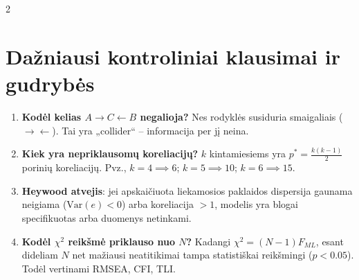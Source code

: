 \documentclass[9pt,a4paper]{article}
\begin{document}
\begin{multicols*}{2}
\section{Dažniausi kontroliniai klausimai ir gudrybės}
\begin{enumerate}
    \item \textbf{Kodėl kelias $A \to C \leftarrow B$ negalioja?}
    Nes rodyklės susiduria smaigaliais ($\to \leftarrow$). Tai yra „collider“ -- informacija per jį neina.
    \item \textbf{Kiek yra nepriklausomų koreliacijų?}
    $k$ kintamiesiems yra $p^* = \frac{k(k-1)}{2}$ porinių koreliacijų. Pvz., $k=4 \implies 6$; $k=5 \implies 10$; $k=6 \implies 15$.
    \item \textbf{Heywood atvejis}: jei apskaičiuota liekamosios paklaidos dispersija gaunama neigiama ($\text{Var}(e) < 0$) arba koreliacija $> 1$, modelis yra blogai specifikuotas arba duomenys netinkami.
    \item \textbf{Kodėl $\chi^2$ reikšmė priklauso nuo $N$?}
    Kadangi $\chi^2 = (N-1) F_{ML}$, esant dideliam $N$ net mažiausi neatitikimai tampa statistiškai reikšmingi ($p < 0.05$). Todėl vertinami RMSEA, CFI, TLI.
\end{enumerate}

\end{multicols*}
\end{document}
